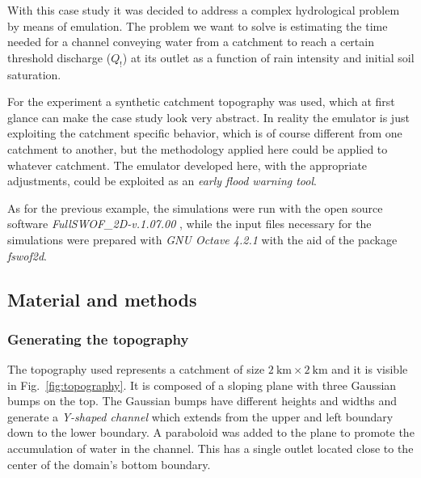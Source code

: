 With this case study it was decided to address a complex hydrological problem by means of emulation.
The problem we want to solve is estimating the time needed for a channel conveying water from a catchment to reach a certain threshold discharge ($Q_!$) at its outlet as a function of rain intensity and initial soil saturation.

For the experiment a synthetic catchment topography was used, which at first glance can make the case study look very abstract.
In reality the emulator is just exploiting the catchment specific behavior, which is of course different from one catchment to another, but the methodology applied here could be applied to whatever catchment.
The emulator developed here, with the appropriate adjustments, could be exploited as an \emph{early flood warning tool}.

As for the previous example, the simulations were run with the open source software \textit{FullSWOF\_2D-v.1.07.00} \autocite{delestre_fullswof:_2014} , while the input files necessary for the simulations were prepared with \textit{GNU Octave 4.2.1} \autocite{octave_community_gnu_2018}  with the aid of the package \textit{fswof2d}.


\subsection{Material and methods}
\subsubsection{Generating the topography}

The topography used represents a catchment of size $\SI{2}{\kilo\meter} \times \SI{2}{\kilo\meter}$ and it is visible in Fig.~\ref{fig:topography}.
It is composed of a sloping plane with three Gaussian bumps on the top.
The Gaussian bumps have different heights and widths and generate a \emph{Y-shaped channel} which extends from the upper and left boundary down to the lower boundary.
A paraboloid was added to the plane to promote the accumulation of water in the channel.
This has a single outlet located close to the center of the domain's bottom boundary.

